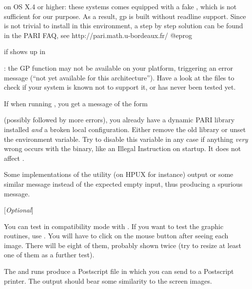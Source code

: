 \item on OS X.4 or higher: these systems comes equipped with a fake
, which is not sufficient for our purpose. As a result, gp is
built without readline support. Since  is not trivial to
install in this environment, a step by step solution can be found in the PARI
FAQ, see
\bprog
  http://pari.math.u-bordeaux.fr/
@eprog


 if  shows up in 

\item {}: the GP function  may not be available on
your platform, triggering an error message (``not yet available for this
architecture''). Have a look at the  files to check if your
system is known not to support it, or has never been tested yet.

\item If when running , you get a message of the form


\noindent (possibly followed by more errors), you already have a dynamic PARI
library installed \emph{and} a broken local configuration. Either remove the
old library or unset the  environment variable. Try to
disable this variable in any case if anything \emph{very} wrong occurs with
the  binary, like an Illegal Instruction on startup. It does not
affect .

\item Some implementations of the  utility (on HPUX for
instance) output  or some similar
message instead of the expected empty input, thus producing a spurious
\kbd{[BUG]} message.

 [{\sl Optional\/}]

You can test  in compatibility mode with . If
you want to test the graphic routines, use . You will
have to click on the mouse button after seeing each image. There will be
eight of them, probably shown twice (try to resize at least one of them as a
further test).

The  and  runs produce a Postscript
file  in  which you can send to a Postscript
printer. The output should bear some similarity to the screen images.

